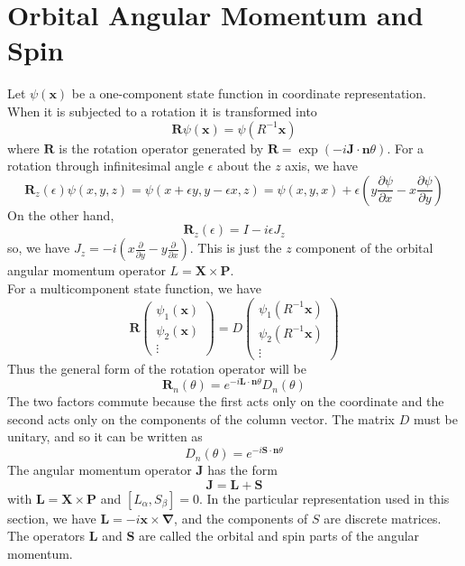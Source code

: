 \section{Orbital Angular Momentum and Spin}
Let $\psi(\bm{x})$ be a one-component state function in coordinate representation. When it is subjected to a rotation it is transformed into
\[\bm{R}\psi(\bm{x}) = \psi(R^{-1}\bm{x})\]
where $\bm{R}$ is the rotation operator generated by $\bm{R} = \exp(-i\bm{J}\cdot\bm{n}\theta)$. For a rotation through infinitesimal angle $\epsilon$ about the $z$ axis, we have
\[\bm{R}_z(\epsilon) \psi(x,y,z) = \psi(x+\epsilon y,y-\epsilon x,z) = \psi(x,y,x) + \epsilon (y \frac{\partial \psi}{\partial x} - x \frac{\partial \psi}{\partial y})\]
On the other hand, 
\[\bm{R}_z(\epsilon) = I - i\epsilon J_z\]
so, we have $J_z = -i(x \frac{\partial}{\partial y} - y \frac{\partial}{\partial x})$. This is just the $z$ component of the orbital angular momentum operator $L = \bm{X} \times \bm{P}$.\\
For a multicomponent state function, we have
\[\bm{R} \left( \begin{matrix} \psi_1(\bm{x}) \\ \psi_2(\bm{x}) \\  \vdots \end{matrix} \right) = D \left( \begin{matrix} \psi_1(R^{-1}\bm{x}) \\ \psi_2(R^{-1}\bm{x}) \\  \vdots \end{matrix} \right)\]
Thus the general form of the rotation operator will be
\[\bm{R}_{n}(\theta) = e^{-i\bm{L}\cdot\bm{n}\theta}D_n(\theta)\]
The two factors commute because the first acts only on the coordinate and the second acts only on the components of the column vector. The matrix $D$ must be unitary, and so it can be written as
\[D_n(\theta) = e^{-i\bm{S}\cdot\bm{n}\theta}\]
The angular momentum operator $\bm{J}$ has the form
\[\bm{J} = \bm{L} + \bm{S}\]
with $\bm{L} = \bm{X} \times \bm{P}$ and $[L_{\alpha},S_{\beta}] = 0$. In the particular representation used in this section, we have $\bm{L} = -i\bm{x}\times\bm{\nabla}$, and the components of $S$ are
discrete matrices. The operators $\bm{L}$ and $\bm{S}$ are called the orbital and spin parts of the angular momentum.
